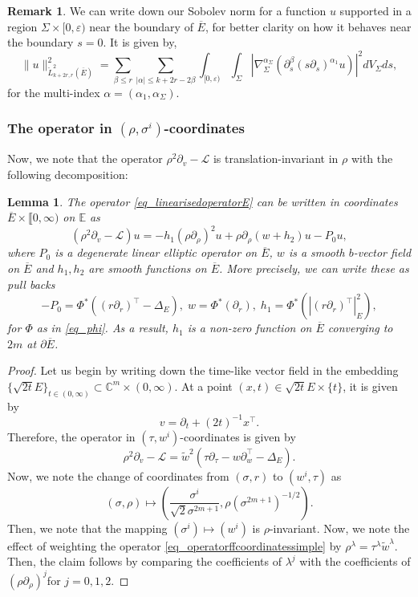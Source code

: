\documentclass[10pt, a4paper]{article}
\theoremstyle{plain}%
\newtheorem{lem}[theorem]{Lemma}
\theoremstyle{definition}
\newtheorem{rem}[theorem]{Remark}
\numberwithin{figure}{section}
\numberwithin{equation}{section}
\newcommand{\bC}{\mathbb{C}}
\newcommand{\bE}{\mathbb{E}}
\newcommand{\pa}{\partial}
\newcommand{\ep}{\varepsilon}
\newcommand{\cL}{\mathcal{L}}
\newcommand{\oE}{{\overline{E}}}
\newcommand{\tw}{\tilde{w}}
\begin{document}
\begin{rem}
We can write down our Sobolev norm for a function $u$ supported in a region $\Sigma\times [0,\ep)$ near the boundary of $\oE$, for better clarity on how it behaves near the boundary $s=0$. It is given by,\[
\|u\|^2_{\check{L}^2_{k+2r,r}(\oE)}=\sum_{\beta\leq r}\sum_{|\alpha|\leq k+2r-2\beta} \int_{[0,\ep)}\int_\Sigma |\nabla^{\alpha_{\Sigma}}_{\Sigma}(\pa_s^\beta(s\pa_s)^{\alpha_1}u)|^2dV_\Sigma ds, 
\]
for the multi-index $\alpha = (\alpha_1,\alpha_\Sigma)$.
\end{rem}



\subsubsection{The operator in $(\rho,\sigma^i)$-coordinates}
Now, we note that the operator $\rho^2\pa_v-\cL$ is translation-invariant in $\rho$ with the following decomposition:

\begin{lem}\label{lem_h1nonzero}
	The operator \eqref{eq_linearisedoperatorE} can be written in coordinates $\oE\times \llbracket0,\infty)$ on $\bE$ as 
	\[
	(\rho^2\pa_v-\cL)u = -h_1(\rho\pa_\rho)^2u+\rho\pa_\rho(w+ h_2)u - P_0u,
	\]
	where $P_0$ is a degenerate linear elliptic operator on $\oE$, $w$ is a smooth $b$-vector field on $\oE$ and $h_1,h_2$ are smooth functions on $\oE$. More precisely, we can write these as pull backs \[
	-P_0 = \Phi^*((r\pa_r)^\top-\Delta_E), \; w = \Phi^*(\pa_r),\; h_1 = \Phi^*(|(r\pa_r)^\top|^2_{E}),
	\]
	for $\Phi$ as in \eqref{eq_phi}.	As a result, $h_1$ is a non-zero function on $\oE$ converging to $2m$ at $\pa\oE$.
\end{lem}
\begin{proof} Let us begin by writing down the time-like vector field in the embedding $\{\sqrt{2t}E\}_{t\in(0,\infty)}\subset\bC^m\times(0,\infty)$. At a point $(x,t)\in\sqrt{2t}E\times\{t\}$, it is given by \[
	v = \pa_t + (2t)^{-1}x^\top.
	\]
	Therefore, the operator in $(\tau,w^i)$-coordinates is given by
	\begin{equation}\label{eq_operatorffcoordinatessimple}
	\rho^2\pa_v-\cL = \tw^2(\tau\pa_\tau-w\pa_w^\top-\Delta_E).
	\end{equation}
	Now, we note the change of coordinates from $(\sigma,r)$ to $(w^i,\tau)$ as \[
	(\sigma,\rho)\mapsto (\frac{\sigma^i}{\sqrt{2}\sigma^{2m+1}}, \rho (\sigma^{2m+1})^{-1/2}).
	\]
	Then, we note that the mapping $(\sigma^i)\mapsto (w^i)$ is $\rho$-invariant. Now, we note the effect of weighting the operator \eqref{eq_operatorffcoordinatessimple} by $\rho^\lambda = \tau^\lambda \tw^\lambda$. Then, the claim follows by comparing the coefficients of $\lambda^j$ with the coefficients of $(\rho\pa_\rho)^j$for $j=0,1,2$.
\end{proof}
\end{document}
